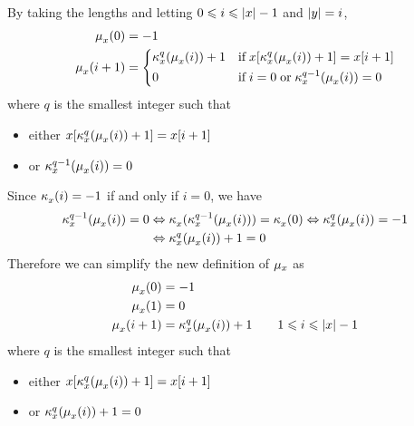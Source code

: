 By taking the lengths and letting \(0 \leqslant i \leqslant \lvert{x}\lvert{} -
1\) and \(\lvert{y}\lvert{} = i\),
\begin{align*}
\mu_{x}^{}(0) &= -1\\
\mu_{x}^{}(i + 1) &=
\left\lbrace
\begin{aligned}
  & \kappa_{x}^{q}(\mu_{x}^{}(i)) + 1
  && \text{if} \; x[\kappa_{x}^{q}(\mu_{x}^{}(i)) + 1]=x[i + 1]\\
  & 0
  && \text{if} \; i = 0 \; \text{or} \;
     \kappa_{x}^{q-1}(\mu_{x}^{}(i)) = 0
\end{aligned}
\right.
\end{align*}
where \(q\) is the smallest integer such that
\begin{itemize}

  \item either \(x[\kappa_{x}^{q}(\mu_{x}^{}(i)) + 1]=x[i+1]\) 

  \item or \(\kappa_{x}^{q-1}(\mu_{x}^{}(i)) = 0\)

\end{itemize}
Since \(\kappa_{x}^{}(i) = -1\) if and only if \(i=0\), we have
\begin{align*}
\kappa_{x}^{q-1}(\mu_{x}^{}(i)) = 0
&\Leftrightarrow
\kappa_{x}^{}(\kappa_{x}^{q-1}(\mu_{x}^{}(i))) =
\kappa_{x}^{}(0)
\Leftrightarrow
\kappa_{x}^{q}(\mu_{x}^{}(i)) = -1\\
&\Leftrightarrow
\kappa_{x}^{q}(\mu_{x}^{}(i)) + 1 = 0
\end{align*}
Therefore we can simplify the new definition of \(\mu_{x}\)
as
\begin{align*}
\mu_{x}^{}(0) &= -1\\
\mu_{x}^{}(1) &= 0\\
\mu_{x}^{}(i + 1) &= \kappa_{x}^{q}(\mu_{x}^{}(i)) + 1
\qquad 1 \leqslant i \leqslant \lvert{x}\lvert{} - 1
\end{align*}
where \(q\) is the smallest integer such that
\begin{itemize}

  \item either \(x[\kappa_{x}^{q}(\mu_{x}^{}(i)) + 1]=x[i+1]\)
  
  \item or \(\kappa_{x}^{q}(\mu_{x}^{}(i)) + 1 = 0\)

\end{itemize}
